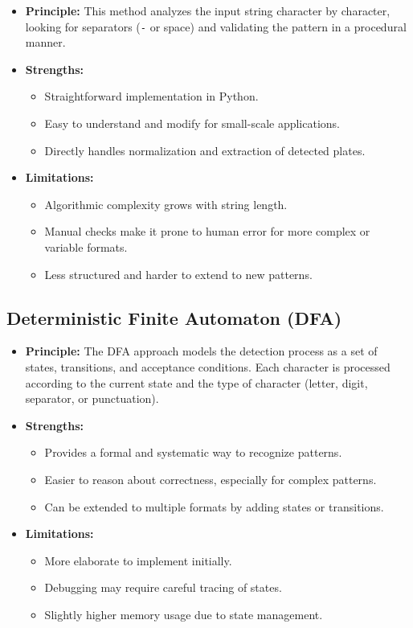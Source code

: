 \documentclass[12pt,a4paper]{article}
\begin{document}
\begin{itemize}
    \item \textbf{Principle:} This method analyzes the input string character by character, looking for separators (\texttt{-} or space) and validating the pattern in a procedural manner.
    \item \textbf{Strengths:} 
        \begin{itemize}
            \item Straightforward implementation in Python.
            \item Easy to understand and modify for small-scale applications.
            \item Directly handles normalization and extraction of detected plates.
        \end{itemize}
    \item \textbf{Limitations:} 
        \begin{itemize}
            \item Algorithmic complexity grows with string length.
            \item Manual checks make it prone to human error for more complex or variable formats.
            \item Less structured and harder to extend to new patterns.
        \end{itemize}
\end{itemize}

\subsection{Deterministic Finite Automaton (DFA)}

\begin{itemize}
    \item \textbf{Principle:} The DFA approach models the detection process as a set of states, transitions, and acceptance conditions. Each character is processed according to the current state and the type of character (letter, digit, separator, or punctuation).
    \item \textbf{Strengths:} 
        \begin{itemize}
            \item Provides a formal and systematic way to recognize patterns.
            \item Easier to reason about correctness, especially for complex patterns.
            \item Can be extended to multiple formats by adding states or transitions.
        \end{itemize}
    \item \textbf{Limitations:} 
        \begin{itemize}
            \item More elaborate to implement initially.
            \item Debugging may require careful tracing of states.
            \item Slightly higher memory usage due to state management.
        \end{itemize}
\end{itemize}
\end{document}
